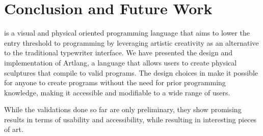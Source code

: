 
\section{Conclusion and Future Work}
\label{sec:conclusion}
\sculpt is a visual and physical oriented programming language that aims to lower the entry threshold to programming by leveraging artistic creativity as an alternative to the traditional typewriter interface.
We have presented the design and implementation of Artlang, a language that allows users to create physical sculptures that compile to valid programs.
The design choices in \sculpt make it possible for anyone to create programs without the need for prior programming knowledge, making it accessible and modifiable to a wide range of users.

While the validations done so far are only preliminary, they show promising results in terms of usability and accessibility, while resulting in interesting pieces of art.

\endinput


